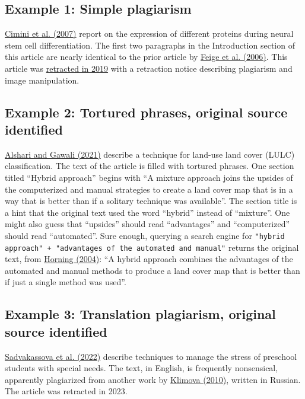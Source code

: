 \documentclass[letterpaper, 12pt]{article}
\begin{document}
\subsection*{Example 1: Simple plagiarism}

\href{https://doi.org/10.1155/2007/48242}{Cimini et al. (2007)} report on the expression of different proteins during neural stem cell differentiation. The first two paragraphs in the Introduction section of this article are nearly identical to the prior article by \href{https://doi.org/10.1016/j.plipres.2005.12.002}{Feige et al. (2006)}. This article was \href{https://doi.org/10.1155/2019/5656198}{retracted in 2019} with a retraction notice describing plagiarism and image manipulation. 

\subsection*{Example 2: Tortured phrases, original source identified}

\href{https://doi.org/10.1016/j.gltp.2021.01.002}{Alshari and Gawali (2021)} describe a technique for land-use land cover (LULC) classification. The text of the article is filled with tortured phrases. One section titled ``Hybrid approach'' begins with ``A mixture approach joins the upsides of the computerized and manual strategies to create a land cover map that is in a way that is better than if a solitary technique was available''. The section title is a hint that the original text used the word ``hybrid'' instead of ``mixture''. One might also guess that ``upsides'' should read ``advantages'' and ``computerized'' should read ``automated''. Sure enough, querying a search engine for \verb|"hybrid approach" + "advantages of the automated and manual"| returns the original text, from \href{https://www.amnh.org/content/download/74344/1391366/file/land-cover-classification-methods.pdf}{Horning (2004)}: ``A hybrid approach combines the advantages of the automated and manual methods to
produce a land cover map that is better than if just a single method was used''.

\pagebreak

\subsection*{Example 3: Translation plagiarism, original source identified}

\href{https://doi.org/10.1111/mbe.12345}{Sadvakassova et al. (2022)} describe techniques to manage the stress of preschool students with special needs. The text, in English, is frequently nonsensical, apparently plagiarized from another work by \href{https://cyberleninka.ru/article/n/harakteristika-trevozhno-fobicheskogo-sostoyaniya-u-detey-doshkolnogo-vozrasta-s-zaderzhkoy-psihicheskogo-razvitiya-kak}{Klimova (2010)}, written in Russian. The article was retracted in 2023.
\end{document}
